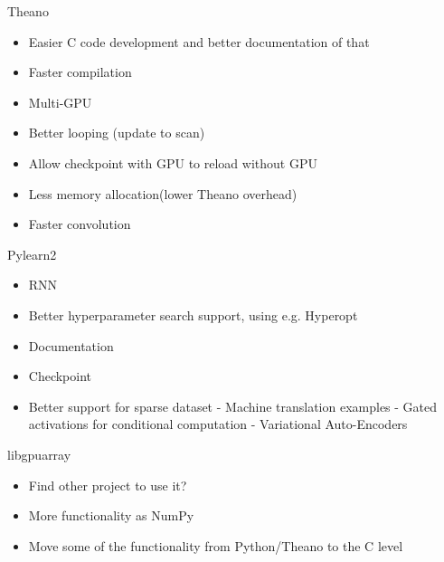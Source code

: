 \documentclass[utf8x,xcolor=pdftex,dvipsnames,table]{beamer}
\begin{document}
\begin{frame}{Theano}
\begin{itemize}
\item Easier C code development and better documentation of that
\item Faster compilation
\item Multi-GPU
\item Better looping (update to scan)
\item Allow checkpoint with GPU to reload without GPU
\item Less memory allocation(lower Theano overhead)
\item Faster convolution
\end{itemize}
\end{frame}

\begin{frame}{Pylearn2}
\begin{itemize}
\item RNN
\item Better hyperparameter search support, using e.g. Hyperopt
\item Documentation
\item Checkpoint
\item Better support for sparse dataset
- Machine translation examples
- Gated activations for conditional computation
- Variational Auto-Encoders
\end{itemize}
\end{frame}

\begin{frame}{libgpuarray}
\begin{itemize}
\item Find other project to use it?
\item More functionality as NumPy
\item Move some of the functionality from Python/Theano to the C level
\end{itemize}
\end{frame}
\end{document}
